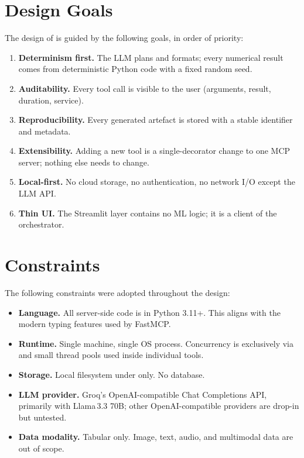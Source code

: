 \section{Design Goals}
\label{sec:design-goals}

The design of \projname{} is guided by the following goals, in order
of priority:

\begin{enumerate}[leftmargin=1.4em]
  \item \textbf{Determinism first.} The LLM plans and formats; every
        numerical result comes from deterministic Python code with a
        fixed random seed.
  \item \textbf{Auditability.} Every tool call is visible to the user
        (arguments, result, duration, service).
  \item \textbf{Reproducibility.} Every generated artefact is stored
        with a stable identifier and metadata.
  \item \textbf{Extensibility.} Adding a new tool is a
        single-decorator change to one MCP server; nothing else needs
        to change.
  \item \textbf{Local-first.} No cloud storage, no authentication, no
        network I/O except the LLM API.
  \item \textbf{Thin UI.} The Streamlit layer contains no ML logic;
        it is a client of the orchestrator.
\end{enumerate}

\section{Constraints}
\label{sec:constraints}

The following constraints were adopted throughout the design:

\begin{itemize}[leftmargin=1.4em]
  \item \textbf{Language.} All server-side code is in Python
        3.11+. This aligns with the modern typing features used by
        FastMCP.
  \item \textbf{Runtime.} Single machine, single OS process.
        Concurrency is exclusively via  and small
        thread pools used inside individual tools.
  \item \textbf{Storage.} Local filesystem under  only.
        No database.
  \item \textbf{LLM provider.} Groq's OpenAI-compatible Chat
        Completions API, primarily with Llama\,3.3 70B; other
        OpenAI-compatible providers are drop-in but untested.
  \item \textbf{Data modality.} Tabular only. Image, text, audio,
        and multimodal data are out of scope.
\end{itemize}

